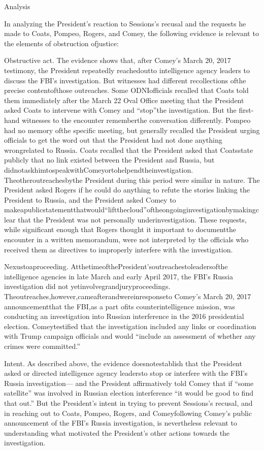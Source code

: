 Analysis

In analyzing the President’s reaction to Sessions’s recusal and the requests he made to Coats, Pompeo, Rogers, and Comey, the following evidence is relevant to the elements of obstruction ofjustice:

Obstructive act. The evidence shows that, after Comey’s March 20, 2017 testimony, the President repeatedly reachedoutto intelligence agency leaders to discuss the FBI’s investigation. But witnesses had different recollections ofthe precise contentofthose outreaches. Some ODNIofficials recalled that Coats told them immediately after the March 22 Oval Office meeting that the President asked Coats to intervene with Comey and “stop”the investigation. But the first-hand witnesses to the encounter rememberthe conversation differently. Pompeo had no memory ofthe specific meeting, but generally recalled the President urging officials to get the word out that the President had not done anything wrongrelated to Russia. Coats recalled that the President asked that Coatsstate publicly that no link existed between the President and Russia, but didnotaskhimtospeakwithComeyortohelpendtheinvestigation. Theotheroutreachesbythe President during this period were similar in nature. The President asked Rogers if he could do anything to refute the stories linking the President to Russia, and the President asked Comey to makeapublicstatementthatwould“liftthecloud”oftheongoinginvestigationbymakingclear that the President was not personally underinvestigation. These requests, while significant enough that Rogers thought it important to documentthe encounter in a written memorandum, were not
interpreted by the officials who received them as directives to improperly interfere with the investigation.

Nexustoaproceeding. AtthetimeofthePresident’soutreachestoleadersofthe intelligence agencies in late March and early April 2017, the FBI’s Russia investigation did not yetinvolvegrandjuryproceedings. Theoutreaches,however,cameafterandwereinresponseto Comey’s March 20, 2017 announcementthat the FBI,as a part ofits counterintelligence mission, was conducting an investigation into Russian interference in the 2016 presidential election. Comeytestified that the investigation included any links or coordination with Trump campaign officials and would “include an assessment of whether any crimes were committed.”

Intent. As described above, the evidence doesnotestablish that the President asked or directed intelligence agency leadersto stop or interfere with the FBI’s Russia investigation— and the President affirmatively told Comey that if “some satellite” was involved in Russian election interference “it would be good to find that out.” But the President’s intent in trying to prevent Sessions’s recusal, and in reaching out to Coats, Pompeo, Rogers, and Comeyfollowing Comey’s public announcement of the FBI’s Russia investigation, is nevertheless relevant to understanding what motivated the President’s other actions towards the investigation.

